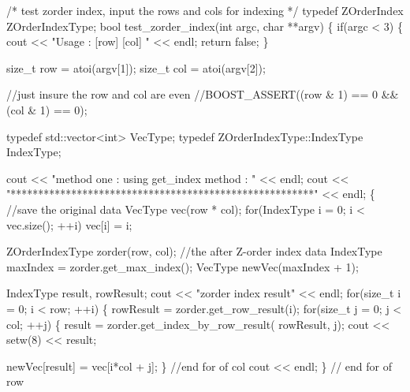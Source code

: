 \begin{DoxyCodeInclude}
\textcolor{comment}{/* test zorder index, input the rows and cols for indexing */}
\textcolor{keyword}{typedef} ZOrderIndex ZOrderIndexType;
\textcolor{keywordtype}{bool} test\_zorder\_index(\textcolor{keywordtype}{int} argc, \textcolor{keywordtype}{char} **argv)
\{
        \textcolor{keywordflow}{if}(argc < 3) \{
                cout << \textcolor{stringliteral}{"Usage : [row] [col] "} << endl;
                \textcolor{keywordflow}{return} \textcolor{keyword}{false};
        \}

        \textcolor{keywordtype}{size\_t} row = atoi(argv[1]);
        \textcolor{keywordtype}{size\_t} col = atoi(argv[2]);

        \textcolor{comment}{//just insure the row and col are even}
        \textcolor{comment}{//BOOST\_ASSERT((row & 1) == 0 && (col & 1) == 0);}

        \textcolor{keyword}{typedef} std::vector<int> VecType;
        \textcolor{keyword}{typedef} ZOrderIndexType::IndexType IndexType;

        cout << \textcolor{stringliteral}{"method one : using get\_index method : "} << endl;
        cout << \textcolor{stringliteral}{"*******************************************************"} << 
      endl;
        \{
                \textcolor{comment}{//save the original data}
                VecType vec(row * col);
                \textcolor{keywordflow}{for}(IndexType i = 0; i < vec.size(); ++i) vec[i] = i;

                ZOrderIndexType zorder(row, col);
                \textcolor{comment}{//the after Z-order index data}
                IndexType maxIndex = zorder.get\_max\_index();
                VecType newVec(maxIndex + 1);

                IndexType result, rowResult;
                cout << \textcolor{stringliteral}{"zorder index result"} << endl;
                \textcolor{keywordflow}{for}(\textcolor{keywordtype}{size\_t} i = 0; i < row; ++i) \{
                        rowResult = zorder.get\_row\_result(i);
                        \textcolor{keywordflow}{for}(\textcolor{keywordtype}{size\_t} j = 0; j < col; ++j) \{
                                result = zorder.get\_index\_by\_row\_result(
      rowResult, j);
                                cout << setw(8) << result;

                                newVec[result] = vec[i*col + j];
                        \} \textcolor{comment}{//end for of col}
                        cout << endl;
                \} \textcolor{comment}{// end for of row}


\end{DoxyCodeInclude}
